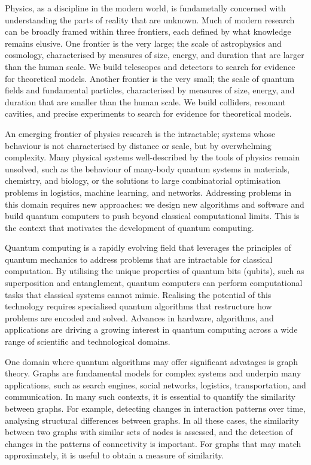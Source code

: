 Physics, as a discipline in the modern world, is fundametally concerned with understanding the parts of reality that are unknown. Much of modern research can be broadly framed within three frontiers, each defined by what knowledge remains elusive. 
One frontier is the very large; the scale of astrophysics and cosmology, characterised by measures of size, energy, and duration that are larger than the human scale. We build telescopes and detectors to search for evidence for theoretical models. 
Another frontier is the very small; the scale of quantum fields and fundamental particles, characterised by measures of size, energy, and duration that are smaller than the human scale. We build colliders, resonant cavities, and precise experiments to search for evidence for theoretical models. 

An emerging frontier of physics research is the intractable; systems whose behaviour is not characterised by distance or scale, but by overwhelming complexity. Many physical systems well-described by the tools of physics remain unsolved, such as the behaviour of many-body quantum systems in materials, chemistry, and biology, or the solutions to large combinatorial optimisation problems in logistics, machine learning, and networks. Addressing problems in this domain requires new approaches: we design new algorithms and software and build quantum computers to push beyond classical computational limits. This is the context that motivates the development of quantum computing.

Quantum computing is a rapidly evolving field that leverages the principles of quantum mechanics to address problems that are intractable for classical computation. By utilising the unique properties of quantum bits (qubits), such as superposition and entanglement, quantum computers can perform computational tasks that classical systems cannot mimic. Realising the potential of this technology requires specialised quantum algorithms that restructure how problems are encoded and solved. Advances in hardware, algorithms, and applications are driving a growing interest in quantum computing across a wide range of scientific and technological domains.

One domain where quantum algorithms may offer significant advatages is graph theory.  Graphs are fundamental models for complex systems and underpin many applications, such as search engines, social networks, logistics, transportation, and communication. In many such contexts, it is essential to quantify the similarity between graphs.
For example, detecting changes in interaction patterns over time, analysing structural differences between graphs.
In all these cases, the similarity between two graphs with similar sets of nodes is assessed, and the detection of changes in the patterns of connectivity is important. For graphs that may match approximately, it is useful to obtain a measure of similarity.

